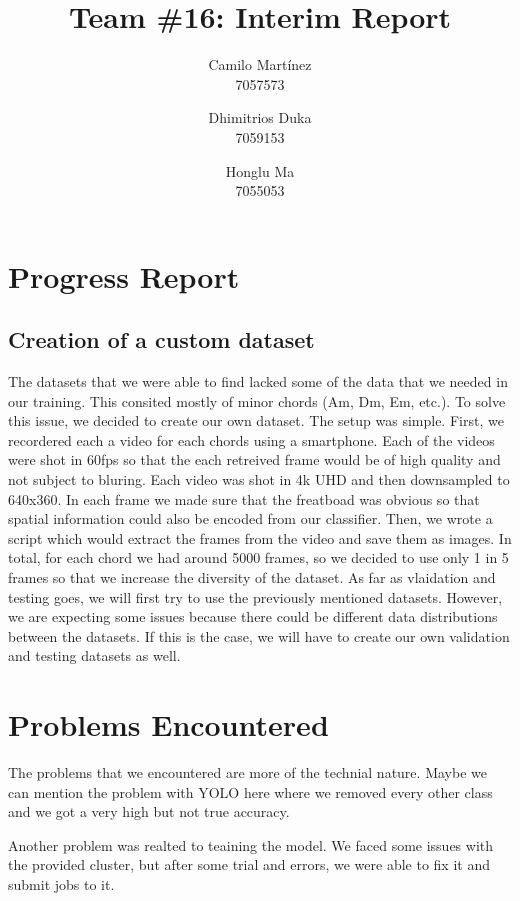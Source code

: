 \documentclass[10pt,twocolumn,letterpaper]{article}
\begin{document}
\title{Team \#16: Interim Report} 

\author{
 Camilo Martínez\\
 7057573\\
    \and
 Dhimitrios Duka\\
 7059153\\
    \and
 Honglu Ma\\
 7055053\\
}
\maketitle

\section{Progress Report}


\subsection{Creation of a custom dataset}
The datasets that we were able to find lacked some of the data that we needed in our training. This consited mostly of minor chords (Am, Dm, Em, etc.). To solve this issue, we decided to create our own dataset. The setup was simple. First, we recordered each a video for each chords using a smartphone. Each of the videos were shot in 60fps so that the each retreived frame would be of high quality and not subject to bluring. Each video was shot in 4k UHD and then downsampled to 640x360. In each frame we made sure that the freatboad was obvious so that spatial information could also be encoded from our classifier. Then, we wrote a script which would extract the frames from the video and save them as images. In total, for each chord we had around 5000 frames, so we decided to use only 1 in 5 frames so that we increase the diversity of the dataset. As far as vlaidation and testing goes,
we will first try to use the previously mentioned datasets. However, we are expecting some issues because there could be different data distributions between the datasets. If this is the case, we will have to create our own validation and testing datasets as well.



\section{Problems Encountered}
The problems that we encountered are more of the technial nature. Maybe we can mention the problem with YOLO here where we removed every other class and we got a very high but not true accuracy. 

Another problem was realted to teaining the model. We faced some issues with the provided cluster, but after some trial and errors, we were able to fix it and submit jobs to it. 

{\small


}
\end{document}
